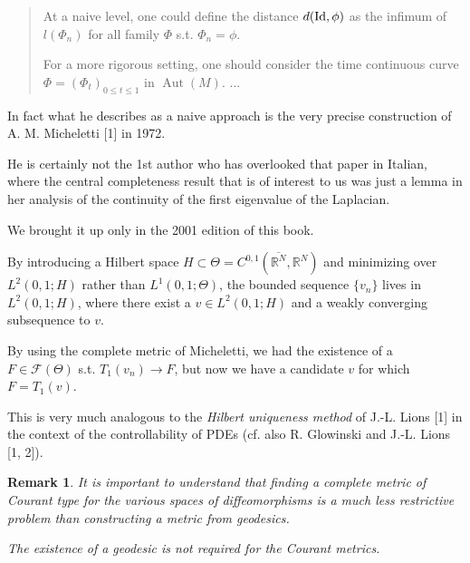 \documentclass{book}
\numberwithin{equation}{section}
\newtheorem{remark}{Remark}[section]
\begin{document}
\begin{enumerate}
\begin{quotation}
        At a naive level, one could define the distance $d({\rm Id},\phi)$ as the infimum of $l(\Phi_n)$ for all family $\Phi$ s.t. $\Phi_n = \phi$.
        
        For a more rigorous setting, one should consider the time continuous curve $\Phi = (\Phi_t)_{0\le t\le 1}$ in $\operatorname{Aut}(M)$. $\ldots$
    \end{quotation}
    In fact what he describes as a naive approach is the very precise construction of A. M. Micheletti [1] in 1972.
    
    He is certainly not the 1st author who has overlooked that paper in Italian, where the central completeness result that is of interest to us was just a lemma in her analysis of the continuity of the first eigenvalue of the Laplacian.
    
    We brought it up only in the 2001 edition of this book.
    
    By introducing a Hilbert space $H\subset\Theta = C^{0,1}(\overline{\mathbb{R}^N},\mathbb{R}^N)$ and minimizing over $L^2(0,1;H)$ rather than $L^1(0,1;\Theta)$, the bounded sequence $\{v_n\}$ lives in $L^2(0,1;H)$, where there exist a $v\in L^2(0,1;H)$ and a weakly converging subsequence to $v$.
    
    By using the complete metric of Micheletti, we had the existence of a $F\in\mathcal{F}(\Theta)$ s.t. $T_1(v_n)\to F$, but now we have a candidate $v$ for which $F = T_1(v)$.
    
    This is very much analogous to the \textit{Hilbert uniqueness method} of J.-L. Lions [1] in the context of the controllability of PDEs (cf. also R. Glowinski and J.-L. Lions [1, 2]).
    
    \begin{remark}
        It is important to understand that finding a complete metric of \emph{Courant type} for the various spaces of diffeomorphisms is a much less restrictive problem than constructing a metric from geodesics.
        
        The existence of a geodesic is not required for the Courant metrics.
    \end{remark}
\end{enumerate}
\end{document}
